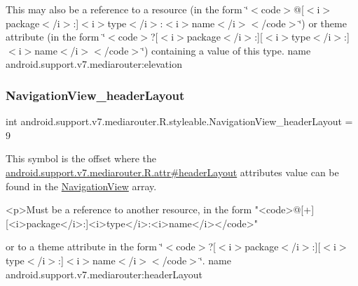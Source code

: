 This may also be a reference to a resource (in the form \char`\"{}$<$code$>$@\mbox{[}$<$i$>$package$<$/i$>$\+:\mbox{]}$<$i$>$type$<$/i$>$\+:$<$i$>$name$<$/i$>$$<$/code$>$\char`\"{}) or theme attribute (in the form \char`\"{}$<$code$>$?\mbox{[}$<$i$>$package$<$/i$>$\+:\mbox{]}\mbox{[}$<$i$>$type$<$/i$>$\+:\mbox{]}$<$i$>$name$<$/i$>$$<$/code$>$\char`\"{}) containing a value of this type.  name android.\+support.\+v7.\+mediarouter\+:elevation \mbox{\label{classandroid_1_1support_1_1v7_1_1mediarouter_1_1R_1_1styleable_a7b1715c8e39e70061cbfe8406b79ca36}} 
\subsubsection{\texorpdfstring{Navigation\+View\+\_\+header\+Layout}{NavigationView\_headerLayout}}
{\footnotesize\ttfamily int android.\+support.\+v7.\+mediarouter.\+R.\+styleable.\+Navigation\+View\+\_\+header\+Layout = 9\hspace{0.3cm}{\ttfamily [static]}}

This symbol is the offset where the \hyperlink{classandroid_1_1support_1_1v7_1_1mediarouter_1_1R_1_1attr_a4be7297f22c11f2c656c89cc78eca215}{android.\+support.\+v7.\+mediarouter.\+R.\+attr\#header\+Layout} attribute\textquotesingle{}s value can be found in the \hyperlink{classandroid_1_1support_1_1v7_1_1mediarouter_1_1R_1_1styleable_a9216c77e145f14d4fdd264c2381fce44}{Navigation\+View} array.

\begin{DoxyVerb}      <p>Must be a reference to another resource, in the form "<code>@[+][<i>package</i>:]<i>type</i>:<i>name</i></code>"
\end{DoxyVerb}
 or to a theme attribute in the form \char`\"{}$<$code$>$?\mbox{[}$<$i$>$package$<$/i$>$\+:\mbox{]}\mbox{[}$<$i$>$type$<$/i$>$\+:\mbox{]}$<$i$>$name$<$/i$>$$<$/code$>$\char`\"{}.  name android.\+support.\+v7.\+mediarouter\+:header\+Layout \mbox{\label{classandroid_1_1support_1_1v7_1_1mediarouter_1_1R_1_1styleable_a0e5c6e8724e0794382e48dafeb5fcbb3}} 
